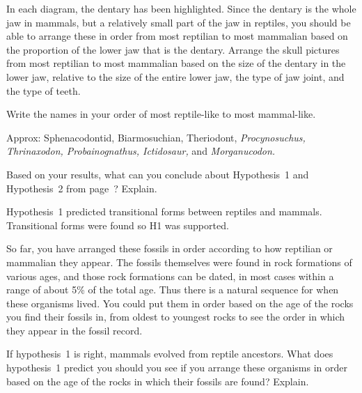 \documentclass[12pt, hidelinks]{exam}
\newcommand*\AnswerBox[2]{%
    \parbox[t][#1]{0.92\textwidth}{%
    \begin{solution}#2\end{solution}}
    \vspace{\stretch{1}}
}
\begin{document}
\begin{questions}
In each diagram, the dentary has been highlighted. Since the dentary is the whole jaw in mammals, but a relatively
small part of the jaw in reptiles, you should be able to arrange these
in order from most reptilian to most mammalian based on the proportion
of the lower jaw that is the dentary. Arrange the skull pictures from most reptilian to most mammalian based on the
size of the dentary in the lower jaw, relative to the size of the entire
lower jaw, the type of jaw joint, and the type of teeth.

\question \label{order_question}
Write the names in your order of most reptile-like to most mammal-like.

\AnswerBox{2\baselineskip}{Approx: Sphenacodontid, Biarmosuchian,
Theriodont, \textit{Procynosuchus, Thrinaxodon, Probainognathus, Ictidosaur,} and \textit{Morganucodon.}}

%
%
%
%
\question
Based on your results, what can you conclude about Hypothesis~1 and Hypothesis~2 from page~\pageref{hypothesis1}? Explain.

\AnswerBox{2\baselineskip}{%
Hypothesis~1 predicted transitional forms between reptiles and mammals. Transitional forms were found so H1 was supported. %
}

So far, you have arranged these fossils in order according to how reptilian or mammalian they appear.  The fossils themselves were found in rock formations of various ages, and those rock formations can be dated, in most cases within a range of about 5\% of the total age.  Thus there is a natural sequence for when these organisms lived.  You could put them in order based on the age of the rocks you find their fossils in, from oldest to youngest rocks to see the order in which they appear in the fossil record. 

\question
If hypothesis~1 is right, mammals evolved from reptile ancestors.  What does hypothesis~1 predict you should you see if you arrange these organisms in order based on the age of the rocks in which their fossils are found?  Explain.


\end{questions}
\end{document}
